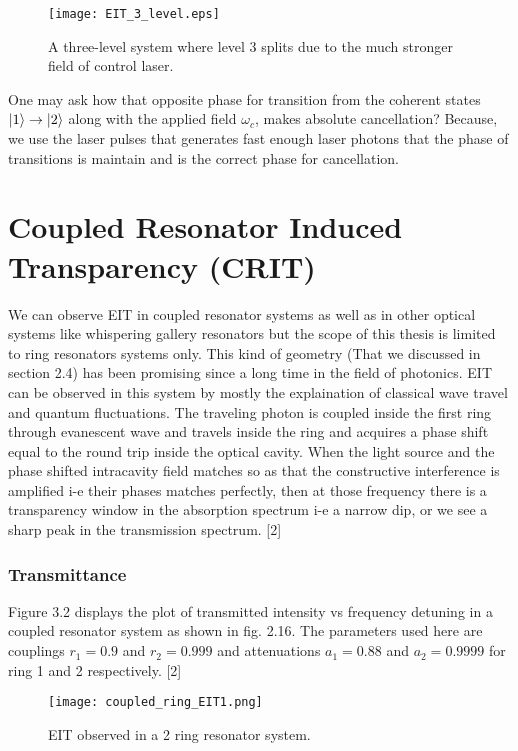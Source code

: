 \begin{figure}[h]
\centering
\texttt{[image: EIT\_3\_level.eps]}
\caption{A three-level system where level 3 splits due to the much stronger field of control laser.}
\end{figure}

One may ask how that opposite phase for transition from the coherent states $\ket{1} \to \ket{2}$ along with the applied field $\omega_{c}$, makes absolute cancellation? Because, we use the laser pulses that generates fast enough laser photons that the phase of transitions is maintain and is the correct phase for cancellation. 


\section{Coupled Resonator Induced Transparency (CRIT)}
We can observe EIT in coupled resonator systems as well as in other optical systems like whispering gallery resonators but the scope of this thesis is limited to ring resonators systems only. This kind of geometry (That we discussed in section 2.4) has been promising since a long time in the field of photonics. EIT can be observed in this system by mostly the explaination of classical wave travel and quantum fluctuations. The traveling photon is coupled inside the first ring through evanescent wave and travels inside the ring and acquires a phase shift equal to the round trip inside the optical cavity. When the light source and the phase shifted intracavity field matches so as that the constructive interference is amplified i-e their phases matches perfectly, then at those frequency there is a transparency window in the absorption spectrum i-e a narrow dip, or we see a sharp peak in the transmission spectrum. [2] 

\subsubsection{Transmittance}
Figure 3.2 displays the plot of transmitted intensity vs frequency detuning in a coupled resonator system as shown in fig. 2.16. The parameters used here are couplings $r_{1} = 0.9$ and $r_{2} = 0.999$ and attenuations $a_{1} = 0.88$ and $a_{2} = 0.9999$ for ring 1 and 2 respectively. [2]

\begin{figure}[h]
\centering
\texttt{[image: coupled\_ring\_EIT1.png]}
\caption{EIT observed in a 2 ring resonator system.}
\end{figure}

